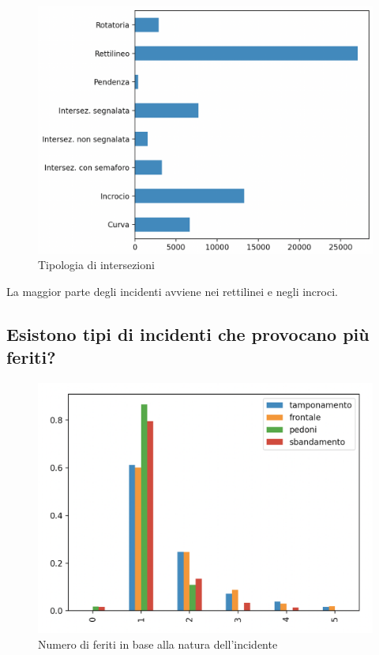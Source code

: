 \documentclass[a4paper]{report}
\begin{document}
\begin{figure}
    \includegraphics[width=\linewidth]{../src/incidenti/incidenti_senza_coords/localizzazione_incidente/intersezioni.png}
    \caption{Tipologia di intersezioni}
    \label{fig:tipo_intersezioni}
\end{figure}

La maggior parte degli incidenti avviene nei rettilinei e negli incroci.


\subsection{Esistono tipi di incidenti che provocano più feriti?}

\begin{figure}
    \includegraphics[width=\linewidth]{../src/incidenti/incidenti_senza_coords/natura_incidente/numero_feriti.png}
    \caption{Numero di feriti in base alla natura dell'incidente}
    \label{fig:numero_feriti}
\end{figure}
\end{document}
